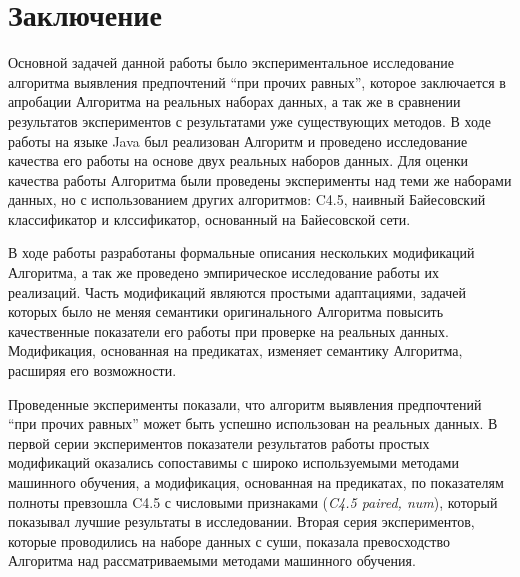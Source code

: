 \chapter*{Заключение}
\label{ch:ending}

Основной задачей данной работы было экспериментальное исследование алгоритма выявления предпочтений \enquote{при прочих равных}, которое заключается в апробации Алгоритма на реальных наборах данных, а так же в сравнении результатов экспериментов с результатами уже существующих методов. В ходе работы на языке Java был реализован Алгоритм и проведено исследование качества его работы на основе двух реальных наборов данных. Для оценки качества работы Алгоритма были проведены эксперименты над теми же наборами данных, но с использованием других алгоритмов: C4.5, наивный Байесовский классификатор и клссификатор, основанный на Байесовской сети.

В ходе работы разработаны формальные описания нескольких модификаций Алгоритма, а так же проведено эмпирическое исследование работы их реализаций. Часть модификаций являются простыми адаптациями, задачей которых было не меняя семантики оригинального Алгоритма повысить качественные показатели его работы при проверке на реальных данных. Модификация, основанная на предикатах, изменяет семантику Алгоритма, расширяя его возможности. 

Проведенные эксперименты показали, что алгоритм выявления предпочтений \enquote{при прочих равных} может быть успешно использован на реальных данных. В первой серии экспериментов показатели результатов работы простых модификаций оказались сопоставимы с широко используемыми методами машинного обучения, а модификация, основанная на предикатах, по показателям полноты превзошла C4.5 с числовыми признаками (\emph{C4.5 paired, num}), который показывал лучшие результаты в исследовании. Вторая серия экспериментов, которые проводились на наборе данных с суши, показала превосходство Алгоритма над рассматриваемыми методами машинного обучения. 
